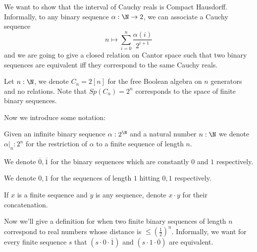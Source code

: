 We want to show that the interval of Cauchy reals is Compact Hausdorff. 
Informally, to any binary sequence $\alpha : \N \to 2$, 
we can associate a Cauchy sequence 
\begin{equation}\label{eqnBinaryEncode}
  n\mapsto \sum\limits_{i = 0 }^n \frac {\alpha(i)}{2^{i+1}}
\end{equation}
and we are going to give a closed relation on Cantor space such that 
two binary sequences are equivalent iff they correspond to the same Cauchy reals. 
\begin{example}
  Let $n:\N$, we denote $C_n = 2[n]$ for the free Boolean algebra on $n$ generators 
  and no relations. 
  Note that $Sp(C_n) = 2^n$ corresponds to the space of finite binary sequences. 
\end{example}
Now we introduce some notation:
\begin{definition}
  \item Given an infinite binary sequence $\alpha:2^\N$ and a natural number $n : \N$  
    we denote $\alpha|_n: 2^n$ for the 
    restriction of $\alpha$ to a finite sequence of length $n$. 
  \item We denote $\overline 0, \overline 1$ 
    for the binary sequences which are constantly $0$ and $1$ respectively. 
  \item We denote $0,1$ for the sequences of length $1$ hitting $0,1$ respectively. 
  \item If $x$ is a finite sequence and $y$ is any sequence, 
    denote $x\cdot y$ for their concatenation. 
\end{definition} 
Now we'll give a definition for when two finite binary sequences of length $n$ correspond 
to real numbers whose distance is $\leq (\frac12)^n$.
Informally, we want for every finite sequence $s$ that 
$(s \cdot 0 \cdot \overline 1)$ and  $(s \cdot 1 \cdot \overline 0)$ are equivalent. 

